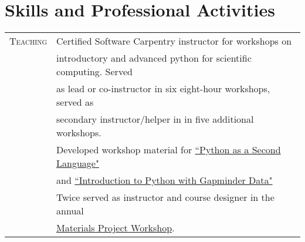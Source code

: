 \documentclass[a4paper,10pt]{article}
\begin{document}
\section{Skills and Professional Activities}
\begin{tabular}{ll}
  \textsc{Teaching} &Certified Software Carpentry instructor for workshops on 
 \\&introductory and advanced python for scientific computing.  Served
 \\&as lead or co-instructor in six eight-hour workshops, served as
 \\&secondary instructor/helper in in five additional workshops. 
 \\&Developed workshop material for \href{https://swcarpentry.github.io/python-second-language/}{``Python as a Second Language"}
 \\&and \href{https://swcarpentry.github.io/python-novice-gapminder/}{``Introduction to Python with Gapminder Data"}\vspace{0.05in}  
 
 \\&Twice served as instructor and course designer  in the annual
 \\&\href{https://github.com/materialsproject/workshop-2017}{Materials Project Workshop}. \vspace{0.05in}\\


\end{tabular}
\end{document}
